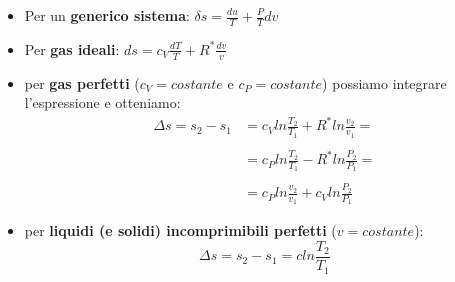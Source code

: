 \begin{itemize}
    \item Per un \textbf{generico sistema}: $\delta s = \frac{du}{T} + \frac{P}{T} dv$
    \item Per \textbf{gas ideali}: $ds = c_V \frac{dT}{T} + R^* \frac{dv}{v}$
    \item per \textbf{gas perfetti} ($c_V = costante$ e $c_P = costante$) possiamo integrare l'espressione e otteniamo: \newline
    \[
        \begin{matrix}
            \Delta s = s_2-s_1 &= c_V ln \frac{T_2}{T_1} + R^* ln \frac{v_2}{v_1} =\\
            \ \\
            &= c_P ln \frac{T_2}{T_1} - R^* ln \frac{P_2}{P_1} =\\
            \ \\
            &= c_P ln \frac{v_2}{v_1} + c_V ln \frac{P_2}{P_1}
        \end{matrix}
    \]
    \item per \textbf{liquidi (e solidi) incomprimibili perfetti} ($v = costante$): 
    \[
        \Delta s = s_2-s_1 = c ln \frac{T_2}{T_1}
    \]
\end{itemize}
